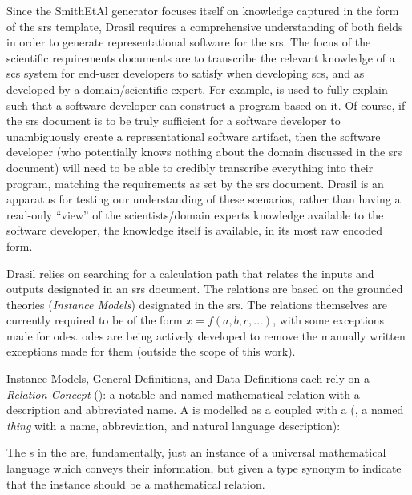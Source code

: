 Since the SmithEtAl generator focuses itself on knowledge captured in the form
of the \acs{srs} template, Drasil requires a comprehensive understanding of both
fields in order to generate representational software for the \acs{srs}. The
focus of the scientific requirements documents are to transcribe the relevant
knowledge of a \acs{scs} system for end-user developers to satisfy when
developing \acs{scs}, and as developed by a domain/scientific expert. For
example,  is used to fully explain 
such that a software developer can construct a program based on it. Of course,
if the \acs{srs} document is to be truly sufficient for a software developer to
unambiguously create a representational software artifact, then the software
developer (who potentially knows nothing about the domain discussed in the
\acs{srs} document) will need to be able to credibly transcribe everything into
their program, matching the requirements as set by the \acs{srs} document.
Drasil is an apparatus for testing our understanding of these scenarios, rather
than having a read-only ``view'' of the scientists/domain experts knowledge
available to the software developer, the knowledge itself is available, in its
most raw encoded form.

Drasil relies on searching for a calculation path that relates the inputs and
outputs designated in an \acs{srs} document. The relations are based on the
grounded theories (\textit{Instance Models}) designated in the \acs{srs}. The
relations themselves are currently required to be of the form \(x = f(a, b, c,
\ldots{})\), with some exceptions made for \acsp{ode}. \acsp{ode} are being
actively developed to remove the manually written exceptions made for them
(outside the scope of this work).

Instance Models, General Definitions, and Data Definitions each rely on a
\textit{Relation Concept} (\RelationConcept{}): a notable and named mathematical
relation with a description and abbreviated name. A \RelationConcept{} is
modelled as a \Relation{} coupled with a \ConceptChunk{} (, a named \textit{thing} with a name,
abbreviation, and natural language description):

\originalRelationConcept{}

The \Relation{}s  in the \RelationConcept{} are, fundamentally,
just an instance of a universal mathematical language which conveys their
information, but given a type synonym to indicate that the instance should
be a mathematical relation.

